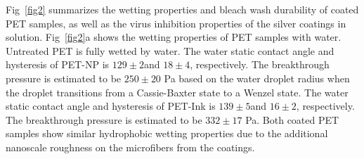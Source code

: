 \documentclass[10pt,letterpaper]{article}
\begin{document}


Fig~\ref{fig2} summarizes the wetting  properties and bleach wash durability of coated PET samples, as well as the virus inhibition properties of the silver coatings in solution.
Fig~\ref{fig2}a shows the wetting properties of PET samples with water. 
Untreated PET is fully wetted by water. The water static contact angle and hysteresis of PET-NP is $129 \pm 2$\degree and $18 \pm 4$\degree, respectively. 
The breakthrough pressure is estimated to be 
$250 \pm 20$ Pa based on the water droplet radius when the droplet transitions from a Cassie-Baxter state to a Wenzel state.  
The water static contact angle and hysteresis of PET-Ink is $139 \pm 5$\degree and $16 \pm 2$\degree, respectively. The breakthrough pressure is estimated to be $332 \pm 17$ Pa. 
Both coated PET samples show similar hydrophobic wetting properties due to the additional nanoscale roughness on the microfibers from the coatings. %
\end{document}
